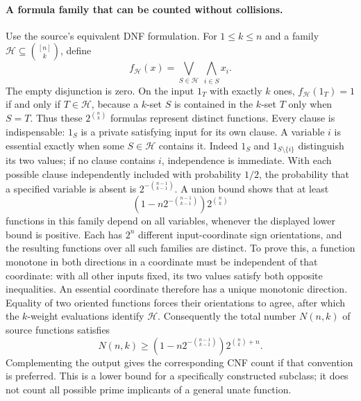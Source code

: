 \documentclass[11pt]{article}
\begin{document}
\paragraph{A formula family that can be counted without collisions.}
Use the source's equivalent DNF formulation. For $1\leq k\leq n$ and a family
$\mathcal H\subseteq\binom{[n]}k$, define
\[
 f_{\mathcal H}(x)=\bigvee_{S\in\mathcal H}\ \bigwedge_{i\in S}x_i.
\]
The empty disjunction is zero. On the input $1_T$ with exactly $k$ ones,
$f_{\mathcal H}(1_T)=1$ if and only if $T\in\mathcal H$, because a $k$-set
$S$ is contained in the $k$-set $T$ only when $S=T$.
Thus these $2^{\binom nk}$ formulas represent distinct functions. Every clause
is indispensable: $1_S$ is a private satisfying input for its own clause.
A variable $i$ is essential exactly when some $S\in\mathcal H$ contains it.
Indeed $1_S$ and $1_{S\setminus\{i\}}$ distinguish its two values; if no clause
contains $i$, independence is immediate.
With each possible clause independently included with probability $1/2$, the
probability that a specified variable is absent is
$2^{-\binom{n-1}{k-1}}$. A union bound shows that at least
\[
 \left(1-n2^{-\binom{n-1}{k-1}}\right)2^{\binom nk}
\]
functions in this family depend on all variables, whenever the displayed lower
bound is positive. Each has $2^n$ different input-coordinate sign orientations,
and the resulting functions over all such families are distinct. To prove this,
a function monotone in both directions in a coordinate must be independent of
that coordinate: with all other inputs fixed, its two values satisfy both
opposite inequalities. An essential coordinate therefore has a unique monotonic
direction. Equality of two oriented functions forces their orientations to agree,
after which the $k$-weight evaluations identify $\mathcal H$.
Consequently the total number $N(n,k)$ of source functions satisfies
\[
 N(n,k)\geq
 \left(1-n2^{-\binom{n-1}{k-1}}\right)2^{\binom nk+n}.
\]
Complementing the output gives the corresponding CNF count if that convention
is preferred. This is a lower bound for a specifically constructed subclass;
it does not count all possible prime implicants of a general unate function.
\end{document}
